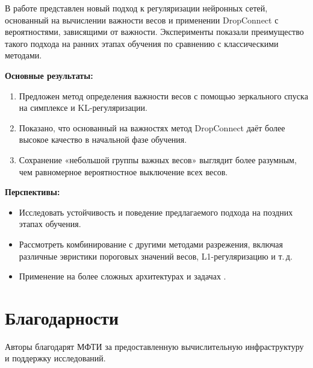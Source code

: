 \documentclass{article}
\begin{document}
В работе представлен новый подход к регуляризации нейронных сетей, основанный на вычислении важности весов и применении DropConnect с вероятностями, зависящими от важности. Эксперименты показали преимущество такого подхода на ранних этапах обучения по сравнению с классическими методами.

\textbf{Основные результаты:}
\begin{enumerate}
    \item Предложен метод определения важности весов с помощью зеркального спуска на симплексе и KL-регуляризации.
    \item Показано, что основанный на важностях метод DropConnect даёт более высокое качество в начальной фазе обучения.
    \item Сохранение «небольшой группы важных весов» выглядит более разумным, чем равномерное вероятностное выключение всех весов.
\end{enumerate}

\textbf{Перспективы:}
\begin{itemize}
    \item Исследовать устойчивость и поведение предлагаемого подхода на поздних этапах обучения.
    \item Рассмотреть комбинирование с другими методами разрежения, включая различные эвристики пороговых значений весов, L1-регуляризацию и т.\,д.
    \item Применение на более сложных архитектурах и задачах .
\end{itemize}

\section*{Благодарности}
Авторы благодарят МФТИ за предоставленную вычислительную инфраструктуру и поддержку исследований.



\nocite{*}
\end{document}
